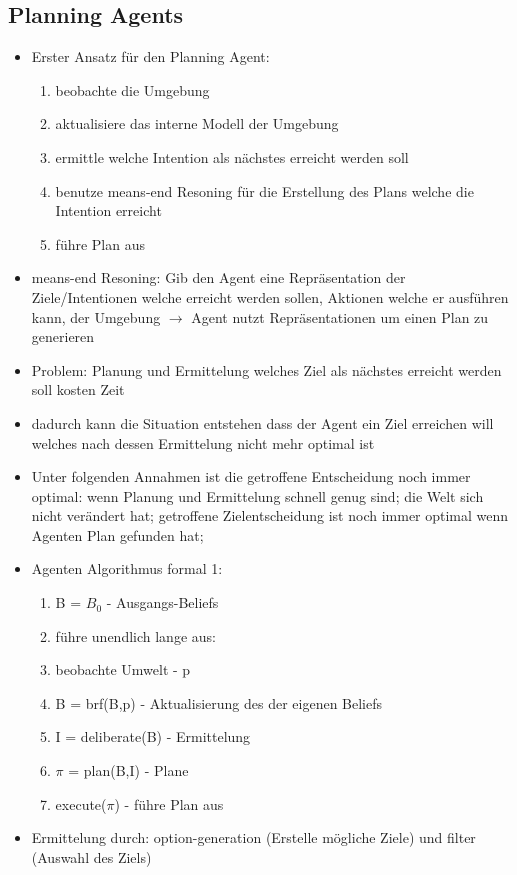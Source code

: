 \documentclass{article} %
\begin{document}
	\subsection{Planning Agents}
	\begin{itemize}
		\item Erster Ansatz für den Planning Agent:
		\begin{enumerate}
			\item beobachte die Umgebung
			\item aktualisiere das interne Modell der Umgebung
			\item ermittle welche Intention als nächstes erreicht werden soll
			\item benutze means-end Resoning für die Erstellung des Plans welche die Intention erreicht
			\item führe Plan aus
		\end{enumerate}
		\item means-end Resoning: Gib den Agent eine Repräsentation der Ziele/Intentionen welche erreicht werden sollen, Aktionen welche er ausführen kann, der Umgebung $\rightarrow$ Agent nutzt Repräsentationen um einen Plan zu generieren
		\item Problem: Planung und Ermittelung welches Ziel als nächstes erreicht werden soll kosten Zeit
		\item dadurch kann die Situation entstehen dass der Agent ein Ziel erreichen will welches nach dessen Ermittelung nicht mehr optimal ist
		\item Unter folgenden Annahmen ist die getroffene Entscheidung noch immer optimal: wenn Planung und  Ermittelung schnell genug sind; die Welt sich nicht verändert hat; getroffene Zielentscheidung ist noch immer optimal wenn Agenten Plan gefunden hat;
		\item Agenten Algorithmus formal 1:
		\begin{enumerate}
			\item B = $B_{0}$ - Ausgangs-Beliefs
			\item führe unendlich lange aus:
			\item beobachte Umwelt - p
			\item B = brf(B,p) - Aktualisierung des der eigenen Beliefs
			\item I = deliberate(B) - Ermittelung
			\item $\pi$ = plan(B,I) - Plane
			\item execute($\pi$) - führe Plan aus
		\end{enumerate}
		\item Ermittelung durch: option-generation (Erstelle mögliche Ziele) und filter (Auswahl des Ziels)

\end{itemize}
\end{document}
